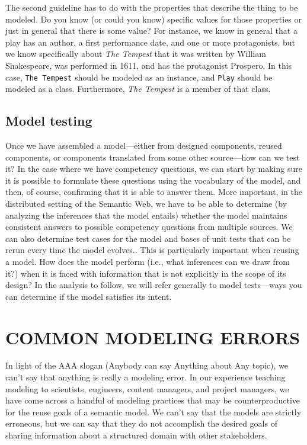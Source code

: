 The second guideline has to do with the properties that describe the
thing to be modeled. Do you know (or could you know) specific values for
those properties or just in general that there is some value? For
instance, we know in general that a play has an author, a first
performance date, and one or more protagonists, but we know specifically
about \emph{The Tempest} that it was written by William Shakespeare, was
performed in 1611, and has the protagonist Prospero. In this case, \texttt{The
Tempest} should be modeled as an instance, and \texttt{Play} should be modeled as
a class. Furthermore, \emph{The Tempest} is a member of that class.

\subsection{Model testing}

Once we have assembled a model---either from designed components, reused
components, or components translated from some other source---how can we
test it? In the case where we have competency questions, we can start by
making sure it is possible to formulate these questions using the vocabulary of the model, 
and then, of course, confirming that it is able to answer them. 
More important, in the distributed setting
of the Semantic Web, we have to be able to determine (by analyzing the inferences that
the model entails) whether the model maintains consistent answers to possible
competency questions from multiple sources. We can also determine test
cases for the model and bases of unit tests that can be rerun every time the model evolves.. This is particularly important when reusing a
model. How does the model perform (i.e., what inferences can we draw
from it?) when it is faced with information that is not explicitly in
the scope of its design? In the analysis to follow, we will refer
generally to model tests---ways you can determine if the model satisfies
its intent.

\section{COMMON MODELING ERRORS}

In light of the AAA slogan (Anybody can say Anything about Any topic),
we can't say that anything is really a modeling error. In our experience
teaching modeling to scientists, engineers, content managers, and
project managers, we have come across a handful of modeling practices
that may be counterproductive for the reuse goals of a semantic model.
We can't say that the models are strictly erroneous, but we can say that
they do not accomplish the desired goals of sharing information about a
structured domain with other stakeholders.

